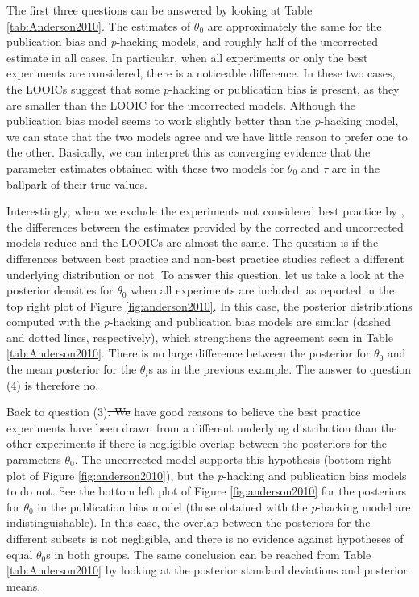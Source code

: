 \documentclass[useAMS,usenatbib,referee]{biom}
\providecommand{\DIFaddtex}[1]{{\protect\color{green}\uwave{#1}}} %
\providecommand{\DIFdeltex}[1]{{\protect\color{red}\sout{#1}}}                      %
\providecommand{\DIFaddbegin}{} %
\providecommand{\DIFaddend}{} %
\providecommand{\DIFdelbegin}{} %
\providecommand{\DIFdelend}{} %
\providecommand{\DIFadd}[1]{\texorpdfstring{\DIFaddtex{#1}}{#1}} %
\providecommand{\DIFdel}[1]{\texorpdfstring{\DIFdeltex{#1}}{}} %
\begin{document}


The first three questions can be answered by looking at Table \ref{tab:Anderson2010}. The estimates of $\theta_{0}$ are approximately the same for the publication bias and \textit{p}-hacking models, and roughly half of the uncorrected estimate in all cases. In particular, when all experiments or only the best experiments are considered, there is a noticeable difference. In these two cases, the LOOICs suggest that some \textit{p}-hacking or publication bias is present, as they are smaller than the LOOIC for the uncorrected models. Although the publication bias model seems to work slightly better than the \textit{p}-hacking model, we can state that the two models agree and we have little reason to prefer one to the other. Basically, we can interpret this as converging evidence that the parameter estimates obtained with these two models for $\theta_{0}$ and $\tau$ are in the ballpark of their true values.

Interestingly, when we exclude the experiments not considered best practice by \citet{anderson2010violent}, the differences between the estimates provided by the corrected and uncorrected models reduce and the LOOICs are almost the same. The question is if the differences between best practice and non-best practice studies reflect a different underlying distribution or not. To answer this question, let us take a look at the posterior densities for $\theta_{0}$ when all experiments are included, as reported in the top right plot of Figure \ref{fig:anderson2010}. In this case, the posterior distributions computed with the \textit{p}-hacking and publication bias models are similar (dashed and dotted lines, respectively), which strengthens the agreement seen in Table \ref{tab:Anderson2010}. There is no large difference between the posterior for $\theta_{0}$ and the mean posterior for the $\theta_{i}$s as in the previous example. The answer to question (4) is therefore no.

Back to question (3)\DIFdelbegin \DIFdel{. We }\DIFdelend \DIFaddbegin \DIFadd{, we }\DIFaddend have good reasons to believe the best practice experiments have been drawn from a different underlying distribution than the other experiments if there is negligible overlap between the posteriors for the parameters $\theta_{0}$. The uncorrected model supports this hypothesis (bottom right plot of Figure \ref{fig:anderson2010}), but the \textit{p}-hacking and publication bias models to do not. See the bottom left plot of Figure \ref{fig:anderson2010} for the posteriors for $\theta_0$ in the publication bias model (those obtained with the \textit{p}-hacking model are indistinguishable). In this case, the overlap between the posteriors for the different subsets is not negligible, and there is no evidence against hypotheses of equal $\theta_0$s in both groups. The same conclusion can be reached from Table \ref{tab:Anderson2010} by looking at the posterior standard deviations and posterior means.
\end{document}
